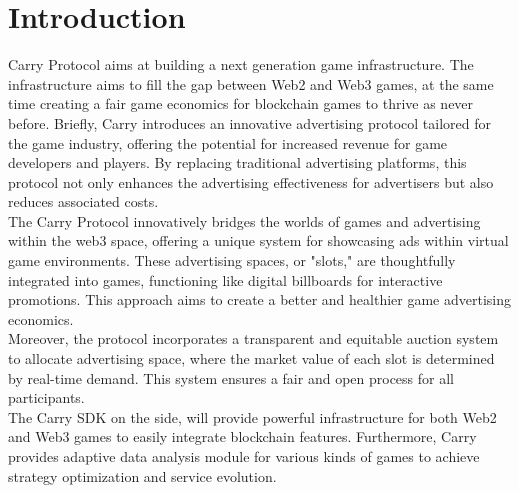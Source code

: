 \section{Introduction}
Carry Protocol aims at building a next generation game infrastructure. The infrastructure aims to fill the gap between Web2 and Web3 games, at the same time creating a fair game economics for blockchain games to thrive as never before. Briefly, Carry introduces an innovative advertising protocol tailored for the game industry, offering the potential for increased revenue for game developers and players. By replacing traditional advertising platforms, this protocol not only enhances the advertising effectiveness for advertisers but also reduces associated costs. \\

The Carry Protocol innovatively bridges the worlds of games and advertising within the web3 space, offering a unique system for showcasing ads within virtual game environments. These advertising spaces, or "slots," are thoughtfully integrated into games, functioning like digital billboards for interactive promotions. This approach aims to create a better and healthier game advertising economics.\\

Moreover, the protocol incorporates a transparent and equitable auction system to allocate advertising space, where the market value of each slot is determined by real-time demand. This system ensures a fair and open process for all participants.\\

The Carry SDK on the side, will provide powerful infrastructure for both Web2 and Web3 games to easily integrate blockchain features. Furthermore, Carry provides adaptive data analysis module for various kinds of games to achieve strategy optimization and service evolution.


